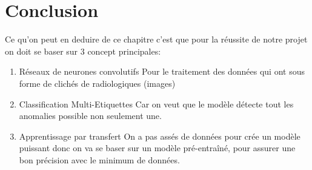 \section*{Conclusion}
        Ce qu'on peut en deduire de ce chapitre c'est que pour la réussite de notre projet on doit se baser sur 3 concept principales:
        \begin{enumerate}
            \item Réseaux de neurones convolutifs
            Pour le traitement des données qui ont sous forme de clichés de radiologiques (images)
            \item Classification Multi-Etiquettes
            Car on veut que le modèle détecte tout les anomalies possible non seulement une.
            \item Apprentissage par transfert
            On a pas assés de données pour crée un modèle puissant donc on va se baser sur un modèle pré-entraîné, pour assurer une bon précision avec le minimum de données.
        \end{enumerate}
